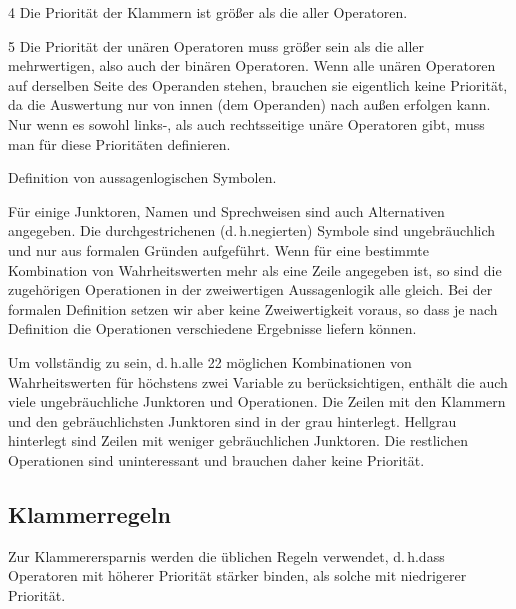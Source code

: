 \documentclass[english,ngerman,parskip=half,headsepline,footsepline,
	fleqn,notitlepage]{scrreprt}
\makeatletter
\newcommand*{\textdh}{d.\@\,h.\@ }
\makeatother
\begin{document}
\begin{table}
\begin{threeparttable}
\begin{tablenotes}
				\item[4] Die Priorität der Klammern
				ist größer als die aller Operatoren.

				\item[5] Die Priorität der unären Operatoren
				muss größer sein als die aller mehrwertigen,
				also auch der binären Operatoren.
				Wenn alle unären Operatoren
				auf derselben Seite des Operanden stehen,
				brauchen sie eigentlich keine Priorität,
				da die Auswertung nur von innen (dem Operanden)
				nach außen erfolgen kann.
				Nur wenn es sowohl links-, als auch rechtsseitige
				unäre Operatoren gibt,
				muss man für diese Prioritäten definieren.

			\end{tablenotes}
			\caption{Definition von aussagenlogischen Symbolen.}
			\label{tab:Symbole}%
		\end{threeparttable}
	\end{table}

	Für einige Junktoren, Namen und Sprechweisen
	sind auch Alternativen angegeben.
	Die durchgestrichenen (\textdh negierten) Symbole sind ungebräuchlich
	und nur aus formalen Gründen aufgeführt.
	Wenn für eine bestimmte Kombination von Wahrheitswerten
	mehr als eine Zeile angegeben ist,
	so sind die zugehörigen Operationen
	in der zweiwertigen Aussagenlogik alle gleich.
	Bei der formalen Definition setzen wir aber keine Zweiwertigkeit voraus,
	so dass je nach Definition
	die Operationen verschiedene Ergebnisse liefern können.

	Um vollständig zu sein,
	\textdh alle 22 möglichen Kombinationen von Wahrheitswerten
	für höchstens zwei Variable zu berücksichtigen,
	enthält die \tablename{}
	auch viele ungebräuchliche Junktoren und Operationen.
	Die Zeilen mit den Klammern und den gebräuchlichsten Junktoren
	sind in der \tablename{} grau hinterlegt.
	Hellgrau hinterlegt sind Zeilen mit weniger gebräuchlichen Junktoren.
	Die restlichen Operationen sind uninteressant
	und brauchen daher keine Priorität.

	\subsection{Klammerregeln}%
	\label{sub:Klammerregeln}

	Zur Klammerersparnis werden die üblichen Regeln verwendet,
	\textdh dass Operatoren mit höherer Priorität stärker binden,
	als solche mit niedrigerer Priorität.
\end{document}
